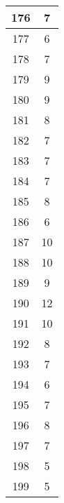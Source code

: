 \documentclass[letterpaper, 12pt]{article}
\begin{document}
\begin{longtable}{|c|c|}
\hline
176 & 7 \\
\hline
177 & 6 \\
\hline
178 & 7 \\
\hline
179 & 9 \\
\hline
180 & 9 \\
\hline
181 & 8 \\
\hline
182 & 7 \\
\hline
183 & 7 \\
\hline
184 & 7 \\
\hline
185 & 8 \\
\hline
186 & 6 \\
\hline
187 & 10 \\
\hline
188 & 10 \\
\hline
189 & 9 \\
\hline
190 & 12 \\
\hline
191 & 10 \\
\hline
192 & 8 \\
\hline
193 & 7 \\
\hline
194 & 6 \\
\hline
195 & 7 \\
\hline
196 & 8 \\
\hline
197 & 7 \\
\hline
198 & 5 \\
\hline
199 & 5 \\
\hline
\end{longtable}
\end{document}
